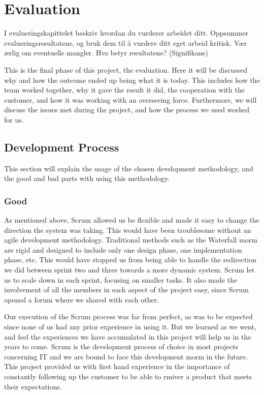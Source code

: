 
\chapter{Evaluation}

\minitoc

I evalueringskapittelet beskriv hvordan du vurderer
arbeidet ditt. Oppsummer evalueringsresultatene, og
bruk dem til å vurdere ditt eget arbeid kritisk. Vær
ærlig om eventuelle mangler.
Hva betyr resultatene? (Signifikans)

This is the final phase of this project, the evaluation. Here it will be discussed why and how the outcome ended up being what it is today. This includes how the team worked together, why it gave the result it did, the cooperation with the customer, and how it was working with an overseeing force. Furthermore, we will discuss the issues met during the project, and how the process we used worked for us.

\clearpage


\section{Development Process}
This section will explain the usage of the chosen development methodology, and the good and bad parts with using this methodology.

\subsection*{Good}
As mentioned above, Scrum allowed us be flexible and made it easy to change the direction the system was taking. This would have been troublesome without an agile development methodology. Traditional methods such as the Waterfall morm are rigid and designed to include only one design phase, one implementation phase, etc. This would have stopped us from being able to handle the redirection we did between sprint two and three towards a more dynamic system. Scrum let us to scale down in each sprint, focusing on smaller tasks. It also made the involvement of all the members in each aspect of the project easy, since Scrum opened a forum where we shared with each other.

Our execution of the Scrum process was far from perfect, as was to be expected since none of us had any prior experience in using it. But we learned as we went, and feel the experiences we have accumulated in this project will help us in the years to come. Scrum is the development process of choice in most projects concerning IT and we are bound to face this development morm in the future. This project provided us with first hand experience in the importance of constantly following up the customer to be able to rmiver a product that meets their expectations.

